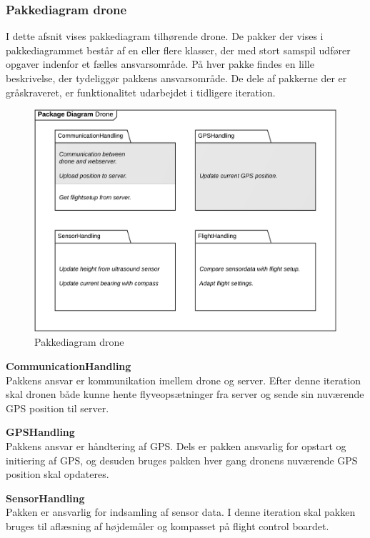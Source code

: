 \newpage
\subsubsection*{Pakkediagram drone}
I dette afsnit vises pakkediagram tilhørende drone. De pakker der vises i pakkediagrammet består af en eller flere klasser, der med stort samspil udfører opgaver indenfor et fælles ansvarsområde. På hver pakke findes en lille beskrivelse, der tydeliggør pakkens ansvarsområde. De dele af pakkerne der er gråskraveret, er funktionalitet udarbejdet i tidligere iteration.


\begin{figure}[H]
	\centering
	\includegraphics[width=1\textwidth]{Billeder/pakke_diagrammer/iteration2_drone.png}
	\vspace{-0.5cm}
	\caption{Pakkediagram drone}
	\label{fig:iteration2_pakke_diagram_drone}
\end{figure}

\textbf{CommunicationHandling}\\
Pakkens ansvar er kommunikation imellem drone og server. Efter denne iteration skal dronen både kunne hente flyveopsætninger fra server og sende sin nuværende GPS position til server.

\textbf{GPSHandling}\\
Pakkens ansvar er håndtering af GPS. Dels er pakken ansvarlig for opstart og initiering af GPS, og desuden bruges pakken hver gang dronens nuværende GPS position skal opdateres.

\textbf{SensorHandling}\\
Pakken er ansvarlig for indsamling af sensor data. I denne iteration skal pakken bruges til aflæsning af højdemåler og kompasset på flight control boardet. 

